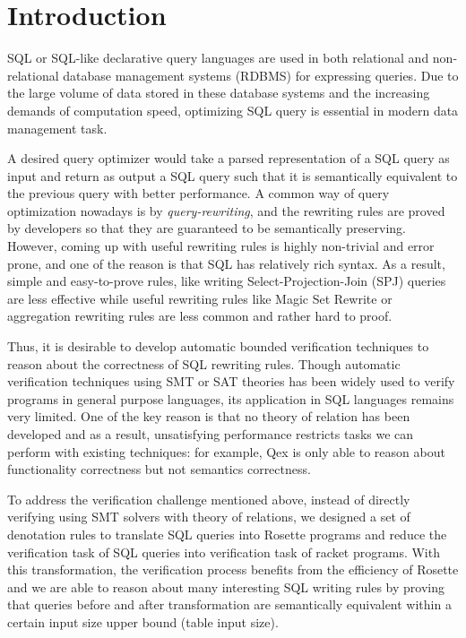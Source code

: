 \section{Introduction}

SQL or SQL-like declarative query languages are used in both relational and non-relational database management systems (RDBMS) for expressing queries. Due to the large volume of data stored in these database systems and the increasing demands of computation speed, optimizing SQL query is essential in modern data management task. 

A desired query optimizer would take a parsed representation of a SQL query as input and return as output a SQL query such that it is semantically equivalent to the previous query with better performance. A common way of query optimization nowadays is by \emph{query-rewriting}, and the rewriting rules are proved by developers so that they are guaranteed to be semantically preserving. However, coming up with useful rewriting rules is highly non-trivial and error prone, and one of the reason is that SQL has relatively rich syntax. As a result, simple and easy-to-prove rules, like writing Select-Projection-Join (SPJ) queries are less effective while useful rewriting rules like Magic Set Rewrite or aggregation rewriting rules are less common and rather hard to proof.

Thus, it is desirable to develop automatic bounded verification techniques to reason about the correctness of SQL rewriting rules. Though automatic verification techniques using SMT or SAT theories has been widely used to verify programs in general purpose languages, its application in SQL languages remains very limited. One of the key reason is that no theory of relation has been developed and as a result, unsatisfying performance restricts tasks we can perform with existing techniques: for example, Qex is only able to reason about functionality correctness but not semantics correctness.

To address the verification challenge mentioned above, instead of directly verifying using SMT solvers with theory of relations, we designed a set of denotation rules to translate SQL queries into Rosette programs and reduce the verification task of SQL queries into verification task of racket programs. With this transformation, the verification process benefits from the efficiency of Rosette and we are able to reason about many interesting SQL writing rules by proving that queries before and after transformation are semantically equivalent within a certain input size upper bound (table input size).

